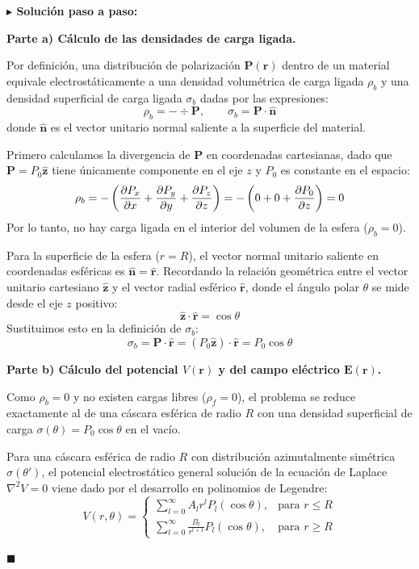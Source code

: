 \documentclass[11pt,a4paper]{book}
\newenvironment{solucion}{%
    \par\medskip\noindent\textbf{\color{blue!65!black}\Large $\blacktriangleright$ Solución paso a paso:}\par\medskip
}{%
    \hfill$\blacksquare$\par\bigskip
}
\newcommand{\rhat}{\hat{\bm{r}}}
\newcommand{\zhat}{\hat{\bm{z}}}
\newcommand{\nhat}{\hat{\bm{n}}}
\newcommand{\Evec}{\bm{E}}
\newcommand{\Pvec}{\bm{P}}
\begin{document}
\begin{solucion}
\textbf{Parte a) Cálculo de las densidades de carga ligada.}

Por definición, una distribución de polarización $\Pvec(\bm{r})$ dentro de un material equivale electrostáticamente a una densidad volumétrica de carga ligada $\rho_b$ y una densidad superficial de carga ligada $\sigma_b$ dadas por las expresiones:
\begin{equation}
    \rho_b = -\div{\Pvec}, \qquad \sigma_b = \Pvec \cdot \nhat
\end{equation}
donde $\nhat$ es el vector unitario normal saliente a la superficie del material.

Primero calculamos la divergencia de $\Pvec$ en coordenadas cartesianas, dado que $\Pvec = P_0 \zhat$ tiene únicamente componente en el eje $z$ y $P_0$ es constante en el espacio:
\begin{equation}
    \rho_b = -\left( \pdv{P_x}{x} + \pdv{P_y}{y} + \pdv{P_z}{z} \right) = -\left( 0 + 0 + \pdv{P_0}{z} \right) = 0
\end{equation}
Por lo tanto, no hay carga ligada en el interior del volumen de la esfera ($\rho_b = 0$).

Para la superficie de la esfera ($r = R$), el vector normal unitario saliente en coordenadas esféricas es $\nhat = \rhat$. Recordando la relación geométrica entre el vector unitario cartesiano $\zhat$ y el vector radial esférico $\rhat$, donde el ángulo polar $\theta$ se mide desde el eje $z$ positivo:
\begin{equation}
    \zhat \cdot \rhat = \cos\theta
\end{equation}
Sustituimos esto en la definición de $\sigma_b$:
\begin{equation}
    \sigma_b = \Pvec \cdot \rhat = (P_0 \zhat) \cdot \rhat = P_0 \cos\theta
\end{equation}

\medskip
\textbf{Parte b) Cálculo del potencial $V(\bm{r})$ y del campo eléctrico $\Evec(\bm{r})$.}

Como $\rho_b = 0$ y no existen cargas libres ($\rho_f = 0$), el problema se reduce exactamente al de una cáscara esférica de radio $R$ con una densidad superficial de carga $\sigma(\theta) = P_0 \cos\theta$ en el vacío.

Para una cáscara esférica de radio $R$ con distribución azimutalmente simétrica $\sigma(\theta')$, el potencial electrostático general solución de la ecuación de Laplace $\nabla^2 V = 0$ viene dado por el desarrollo en polinomios de Legendre:
\begin{equation}
    V(r,\theta) = \begin{cases} 
    \displaystyle \sum_{l=0}^{\infty} A_l r^l P_l(\cos\theta), & \text{para } r \le R \\[12pt]
    \displaystyle \sum_{l=0}^{\infty} \frac{B_l}{r^{l+1}} P_l(\cos\theta), & \text{para } r \ge R
    \end{cases}
\end{equation}


\end{solucion}
\end{document}
